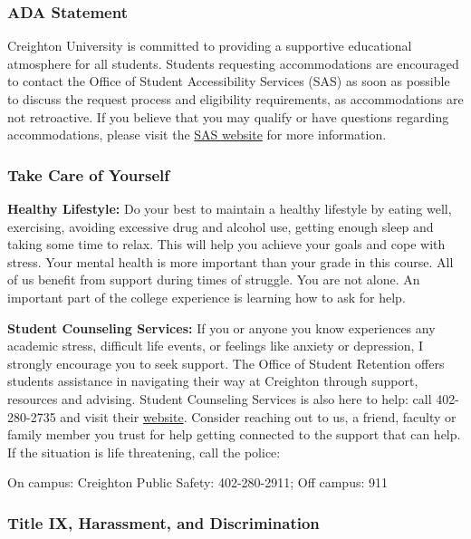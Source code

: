 \documentclass[
  11pt,
  letterpaper,
  DIV=11,
  numbers=noendperiod]{scrartcl}
\begin{document}
\subsubsection{ADA Statement}\label{ada-statement}

Creighton University is committed to providing a supportive educational
atmosphere for all students. Students requesting accommodations are
encouraged to contact the Office of Student Accessibility Services (SAS)
as soon as possible to discuss the request process and eligibility
requirements, as accommodations are not retroactive. If you believe that
you may qualify or have questions regarding accommodations, please visit
the
\href{https://www.creighton.edu/student-success/student-accessibility-services}{SAS
website} for more information.

\subsubsection{Take Care of Yourself}\label{take-care-of-yourself}

\textbf{Healthy Lifestyle:} Do your best to maintain a healthy lifestyle
by eating well, exercising, avoiding excessive drug and alcohol use,
getting enough sleep and taking some time to relax. This will help you
achieve your goals and cope with stress. Your mental health is more
important than your grade in this course. All of us benefit from support
during times of struggle. You are not alone. An important part of the
college experience is learning how to ask for help.

\textbf{Student Counseling Services:} If you or anyone you know
experiences any academic stress, difficult life events, or feelings like
anxiety or depression, I strongly encourage you to seek support. The
Office of Student Retention offers students assistance in navigating
their way at Creighton through support, resources and advising. Student
Counseling Services is also here to help: call 402-280-2735 and visit
their
\href{https://studentlife.creighton.edu/wellness/health-and-counseling/student-counseling-services}{website}.
Consider reaching out to us, a friend, faculty or family member you
trust for help getting connected to the support that can help. If the
situation is life threatening, call the police:

On campus: Creighton Public Safety: 402-280-2911; Off campus: 911

\subsubsection{Title IX, Harassment, and
Discrimination}\label{title-ix-harassment-and-discrimination}
\end{document}
